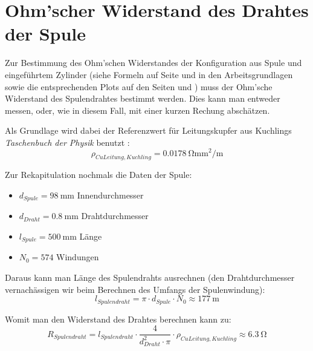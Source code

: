 \clearpage
\section[Widerstand Spulendraht]{Ohm'scher Widerstand des Drahtes der Spule}
\label{app:R_Ohm_0}

Zur   Bestimmung   des   Ohm'schen    Widerstandes   der   Konfiguration   aus
Spule    und    eingef\"uhrtem    Zylinder   (siehe    Formeln    auf    Seite
\pageref{eq:hohlzylinder:LRExact}     und     \pageref{eq:vollzylinder:RExact}
in     den     Arbeitsgrundlagen     sowie    die     entsprechenden     Plots
auf     den     Seiten    \pageref{sec:ausw:subsec:vollz:subsubsec:LR}     und
\pageref{sec:ausw:subsec:hohlz:st:subsubsec:LR}) muss der  Ohm'sche Widerstand
des Spulendrahtes bestimmt werden. Dies kann man entweder messen, oder, wie in
diesem Fall, mit einer kurzen Rechung absch\"atzen.

Als Grundlage wird  dabei der Referenzwert f\"ur  Leitungskupfer aus Kuchlings
\emph{Taschenbuch der Physik} benutzt \cite{ref:kuchling:resistivityTable}:
\begin{equation*}
    \rho_{CuLeitung,Kuchling} = \SI{0.0178}{\ohm\milli\meter\squared\per\meter}
\end{equation*}

Zur Rekapitulation nochmals die Daten der Spule:
\begin{itemize}
   \item
       $d_{Spule} = \SI{98}{\milli\meter}$ Innendurchmesser
   \item
       $d_{Draht} = \SI{0.8}{\milli\meter}$ Drahtdurchmesser
   \item
       $l_{Spule} = \SI{500}{\milli\meter}$ L\"ange
   \item
       $N_0 = \num{574}$ Windungen
\end{itemize}

Daraus  kann man  L\"ange  des Spulendrahts  ausrechnen (den  Drahtdurchmesser
vernach\"assigen wir beim Berechnen des Umfangs der Spulenwindung):
\begin{equation*}
    l_{Spulendraht} = \pi \cdot d_{Spule} \cdot N_0 \approx \SI{177}{\meter}
\end{equation*}

Womit man den Widerstand des Drahtes berechnen kann zu:
\begin{equation*}
    R_{Spulendraht} = l_{Spulendraht} \cdot \frac{4}{d_{Draht}^2 \cdot \pi} \cdot \rho_{CuLeitung,Kuchling} \approx \SI{6.3}{\ohm}
\end{equation*}

